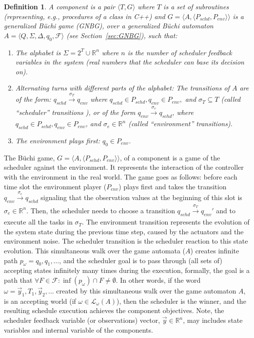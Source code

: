 \documentclass[ twoside, 12pt ]{article}
\newcommand\R{{\mathbb R}}
\newtheorem{dfn}{Definition} %
\newcommand{\buchi}{B\"uchi }
\begin{document}
\begin{dfn}
    A component is a pair $\langle T,G\rangle$ where $T$ is a set of subroutines (representing, e.g., procedures of a class in C++) and $G=\langle A,\langle P_{schd}, P_{env}\rangle \rangle$ is a generalized B{\"u}chi game (GNBG), over a generalized \buchi automaton $A= \langle Q,\Sigma,\Delta,q_0,\mathcal{F} \rangle $ (see Section~\ref{sec:GNBG}), such that:
    \begin{enumerate}
        \item The \textit{alphabet} is $\Sigma = 2^{T} \cup \R^n$ where $n$ is the number of scheduler feedback variables in the system (real numbers that the scheduler can base its decision on).
        \item 
        Alternating turns with different parts of the alphabet:
       	The transitions of $A$ are of the form: $q_{schd} \xrightarrow[]{\sigma_{T}} q_{env}$ where $q_{schd} \in P_{schd}, q_{env} \in P_{env},$ and $\sigma_{T} \subseteq T$ (called  ``scheduler'' transitions ),  or of the form $q_{env} \xrightarrow[]{\sigma_{e}} q_{schd}$, where $q_{schd} \in P_{schd}, q_{env} \in P_{env}$, and $\sigma_{e} \in \R^n$ (called ``environment'' transitions).
        \item The environment plays first: $q_0 \in P_{env}$.
    \end{enumerate}
\end{dfn}

The \buchi game, $G=\langle A,\langle P_{schd}, P_{env}\rangle \rangle$, of a component is a game of the scheduler against the environment. It represents the interaction of the controller with the environment in the real world.
The game goes as follows: before each time slot the environment player ($P_{env}$) plays first and takes the transition $q_{env} \xrightarrow[]{\sigma_{e}} q_{schd}$ signaling that  the observation values at the beginning of this slot is $\sigma_{e} \in \R^n$.
Then, the scheduler needs to choose a transition $q_{schd} \xrightarrow[]{\sigma_{T}} q_{env}'$ and to execute all the tasks in $\sigma_{T}$.
The environment transition represents the evolution of the system state during the previous time step, caused by the actuators and the environment noise. The scheduler transition is the scheduler reaction to this state evolution.
This simultaneous walk over the game automata ($A$) creates infinite path $p_{\omega} = q_0 , q_1, \dots$,
and the scheduler goal is to pass through (all sets of) accepting states infinitely many times during the execution, formally, the goal is a path that $\forall F \in \mathcal{F} : \inf (p_{\omega}) \cap F \ne \emptyset$.
In other words, if the word $\omega = \vec{y}_1 , T_1, \vec{y}_2, \dots $ created by this simultaneous walk over the game automaton $A$, is an accepting world (if $\omega \in \mathcal{L}_{\omega}(A)$), then the scheduler is the winner, and the resulting schedule execution achieves the component objectives.
Note, the scheduler feedback variable (or observations) vector, $\vec{y} \in \R^n$, may includes state variables and internal variable of the components.
\end{document}
